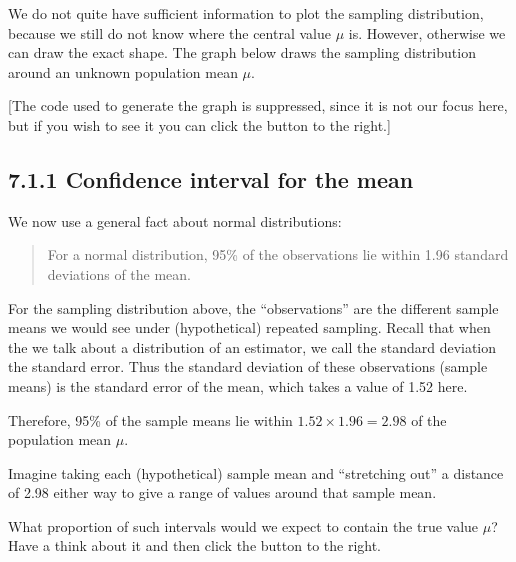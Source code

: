 \documentclass[letterpaper,10pt,english]{jupyterBook}
\begin{document}
\sphinxAtStartPar
We do not quite have sufficient information to plot the sampling distribution, because we still do not know where the central value \(\mu\) is. However, otherwise we can draw the exact shape. The graph below draws the sampling distribution around an unknown population mean \(\mu\).

\sphinxAtStartPar
{[}The code used to generate the graph is suppressed, since it is not our focus here, but if you wish to see it you can click the button to the right.{]}

\noindent{}


\subsection{7.1.1 Confidence interval for the mean}
\label{\detokenize{07.b. Frequentist I:confidence-interval-for-the-mean}}
\sphinxAtStartPar
We now use a general fact about normal distributions:
\begin{quote}

\sphinxAtStartPar
For a normal distribution,  95\% of the observations lie within 1.96 standard deviations of the mean.
\end{quote}

\sphinxAtStartPar
For the sampling distribution above, the “observations” are the different sample means we would see under (hypothetical) repeated sampling. Recall that when the we talk about a distribution of an estimator, we call the standard deviation the standard error. Thus the standard deviation of these observations (sample means) is the standard error of the mean, which takes a value of 1.52 here.

\sphinxAtStartPar
Therefore, 95\% of the sample means lie within \(1.52 \times 1.96 = 2.98\) of the population mean \(\mu\).

\sphinxAtStartPar
Imagine taking each (hypothetical) sample mean and “stretching out” a distance of 2.98 either way to give a range of values around that sample mean.

\noindent{}

\sphinxAtStartPar
What proportion of such intervals would we expect to contain the true value \(\mu\)? Have a think about it and then click the button to the right.
\end{document}
